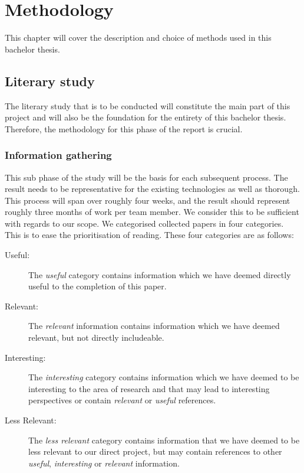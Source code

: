 \chapter{Methodology}
This chapter will cover the description and choice of methods used in this bachelor thesis.
\section{Literary study}
The literary study that is to be conducted will constitute the main part of this project and will also be the foundation for the entirety of this bachelor thesis. Therefore, the methodology for this phase of the report is crucial.

\subsection{Information gathering}
This sub phase of the study will be the basis for each subsequent process. The result needs to be representative for the existing technologies as well as thorough. This process will span over roughly four weeks, and the result should represent roughly three months of work per team member. We consider this to be sufficient with regards to our scope. We categorised collected papers in four categories. This is to ease the prioritisation of reading. These four categories are as follows:

\begin{description}
    \item [Useful:] The \textit{useful} category contains information which we have deemed directly useful to the completion of this paper.
    \item [Relevant:] The \textit{relevant} information contains information which we have deemed relevant, but not directly includeable.
    \item [Interesting:] The \textit{interesting} category contains information which we have deemed to be interesting to the area of research and that may lead to interesting perspectives or contain \textit{relevant} or \textit{useful} references.
    \item [Less Relevant:] The \textit{less relevant} category contains information that we have deemed to be less relevant to our direct project, but may contain references to other \textit{useful}, \textit{interesting} or \textit{relevant} information.
\end{description}

